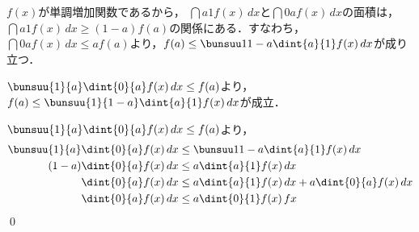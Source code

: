 
$f(x)$が単調増加関数であるから，
$\dint{a}{1}f(x)\,dx$と$\dint{0}{a}f(x)\,dx$の面積は，$\dint{a}{1}f(x)\,dx \geq (1-a)f(a)$の関係にある．すなわち，$\dint{0}{a}f(x)\,dx \leq af(a)$より，$f(a) \leq \bunsuu1{1-a}\dint{a}{1}f(x)\,dx$が成り立つ．

$\bunsuu{1}{a}\dint{0}{a}f(x)\,dx \leq f(a)$より，
$f(a) \leq \bunsuu{1}{1-a} \dint{a}{1}f(x)\,dx$が成立．

$\bunsuu{1}{a}\dint{0}{a}f(x)\,dx \leq f(a)$より，
\begin{align*}
  \bunsuu{1}{a}\dint{0}{a}f(x)\,dx &\leq \bunsuu1{1-a}\dint{a}{1}f(x)\,dx\\
  (1-a)\dint{0}{a}f(x)\,dx &\leq a \dint{a}{1}f(x)\,dx\\
  \dint{0}{a}f(x)\,dx &\leq a\dint{a}{1}f(x)\,dx + a\dint{0}{a}f(x)\,dx\\
  \dint{0}{a}f(x)\,dx &\leq a\dint{0}{1}f(x)\,fx
\end{align*}
\qed
